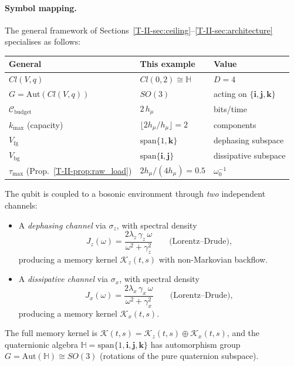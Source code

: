 \documentclass[12pt,a4paper,openany]{book}
\begin{document}
\paragraph{Symbol mapping.}
The general framework of Sections~\ref{T-II-sec:ceiling}--\ref{T-II-sec:architecture}
specialises as follows:
\begin{center}
\small
\begin{tabular}{@{}lll@{}}
\toprule
General & This example & Value \\
\midrule
$Cl(V,q)$ & $Cl(0,2) \cong \mathbb{H}$
  & $D = 4$ \\
$G = \mathrm{Aut}(Cl(V,q))$ & $SO(3)$
  & acting on $\{\mathbf{i},\mathbf{j},\mathbf{k}\}$\\
$\mathcal{C}_{\mathrm{budget}}$ & $2\,h_\mu$
  & bits/time \\
$k_{\max}$ (capacity)
  & $\lfloor 2h_\mu / h_\mu \rfloor = 2$
  & components \\
$V_{\mathrm{fg}}$ & $\mathrm{span}\{1,\mathbf{k}\}$
  & dephasing subspace \\
$V_{\mathrm{bg}}$ & $\mathrm{span}\{\mathbf{i},\mathbf{j}\}$
  & dissipative subspace \\
$\tau_{\max}$ (Prop.~\ref{T-II-prop:raw_load})
  & $2h_\mu / (4h_\mu) = 0.5$
  & $\omega_0^{-1}$ \\
\bottomrule
\end{tabular}
\end{center}
The qubit is coupled to a bosonic environment through
\emph{two} independent channels:
\begin{itemize}
\item A \emph{dephasing channel} via $\sigma_z$, with
  spectral density
  \begin{equation}
  \label{T-II-eq:J_z}
  J_z(\omega)
  = \frac{2\lambda_z\,\gamma_z\,\omega}
         {\omega^2 + \gamma_z^2}
  \qquad\text{(Lorentz--Drude)},
  \end{equation}
  producing a memory kernel $\mathcal{K}_z(t,s)$ with
  non-Markovian backflow.
\item A \emph{dissipative channel} via $\sigma_x$, with
  spectral density
  \begin{equation}
  \label{T-II-eq:J_x}
  J_x(\omega)
  = \frac{2\lambda_x\,\gamma_x\,\omega}
         {\omega^2 + \gamma_x^2}
  \qquad\text{(Lorentz--Drude)},
  \end{equation}
  producing a memory kernel $\mathcal{K}_x(t,s)$.
\end{itemize}

The full memory kernel is
$\mathcal{K}(t,s)
= \mathcal{K}_z(t,s) \oplus \mathcal{K}_x(t,s)$,
and the quaternionic algebra
$\mathbb{H} = \mathrm{span}\{1, \mathbf{i}, \mathbf{j},
\mathbf{k}\}$
has automorphism group
$G = \mathrm{Aut}(\mathbb{H}) \cong SO(3)$
(rotations of the pure quaternion subspace).
\end{document}
